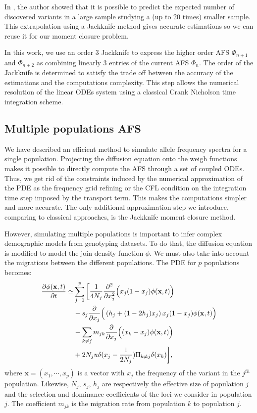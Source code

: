 In \cite{gravel2014}, the author showed that it is possible to predict the expected number of discovered variants in a large sample studying a (up to 20 times) smaller sample. This extrapolation using a Jackknife method gives accurate estimations so we can reuse it for our moment closure problem.

In this work, we use an order 3 Jackknife to express the higher order AFS $\Phi_{n+1}$ and $\Phi_{n+2}$ as combining linearly 3 entries of the current AFS $\Phi_n$. The order of the Jackknife is determined to satisfy the trade off between the accuracy of the estimations and the computations complexity. This step allows the numerical resolution of the linear ODEs system using a classical Crank Nicholson time integration scheme.  

\subsection{Multiple populations AFS}
We have described an efficient method to simulate allele frequency spectra for a single population. Projecting the diffusion equation onto the weigh functions makes it possible to directly compute the AFS through a set of coupled ODEs. Thus, we get rid of the constraints induced by the numerical approximation of the PDE as the frequency grid refining or the CFL condition on the integration time step imposed by the transport term. This makes the computations simpler and more accurate. The only additional approximation step we introduce, comparing to classical approaches, is the Jackknife moment closure method.

However, simulating multiple populations is important to infer complex demographic models from genotyping datasets. To do that, the diffusion equation is modified to model the join density function $\phi$. We must also take into account the migrations between the different populations. The PDE for $p$ populations becomes: 
\begin{equation}
\begin{split}
\frac{\partial \phi(\textbf{x},t)}{\partial t}\simeq & \sum_{j=1}^p \bigg[ \frac{1}{4 N_j} \frac{\partial^2 }{\partial x_j^2} \Big( x_j(1-x_j) \phi(\textbf{x},t)\Big) \\
					&-s_j \frac{\partial }{\partial x_j}\Big( \left(h_j+(1-2h_j)x_j \right)x_j (1-x_j) \phi(\textbf{x},t)\Big) \\
					&-\sum_{k \neq j}m_{jk}\frac{\partial }{\partial x_j}\Big( (x_k-x_j) \phi(\textbf{x},t)\Big)\\
					&+ 2 N_j u \delta(x_j-\frac{1}{2 N_j})\Pi_{k\neq j}\delta(x_k)\bigg],
\end{split}
\label{eq:diffnp}
\end{equation}
where $\textbf{x} = (x_1, \cdots, x_p)$ is a vector with $x_j$ the frequency of the variant in the $j^{th}$ population. Likewise, $N_j$, $s_j$, $h_j$ are respectively the effective size of population $j$ and the selection and dominance coefficients of the loci we consider in population $j$. The coefficient $m_{jk}$ is the migration rate from population $k$ to population $j$.

